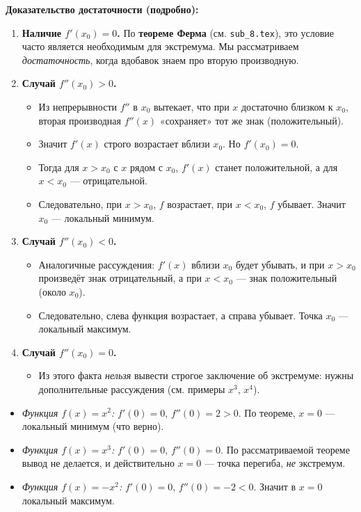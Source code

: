 \textbf{Доказательство достаточности (подробно):}

\begin{enumerate}
  \item \textbf{Наличие $f'(x_0)=0$.}  
    По \textbf{теореме Ферма} (см. \texttt{sub\_8.tex}), это условие часто является необходимым для экстремума. Мы рассматриваем \emph{достаточность}, когда вдобавок знаем про вторую производную.
  \item \textbf{Случай $f''(x_0)>0$.}  
    \begin{itemize}
      \item Из непрерывности $f''$ в $x_0$ вытекает, что при $x$ достаточно близком к $x_0$, вторая производная $f''(x)$ «сохраняет» тот же знак (положительный).  
      \item Значит $f'(x)$ строго возрастает вблизи $x_0$. Но $f'(x_0)=0$.  
      \item Тогда для $x>x_0$ с $x$ рядом с $x_0$, $f'(x)$ станет положительной, а для $x<x_0$ — отрицательной.  
      \item Следовательно, при $x>x_0$, $f$ возрастает, при $x<x_0$, $f$ убывает. Значит $x_0$ — локальный минимум.
    \end{itemize}
  \item \textbf{Случай $f''(x_0)<0$.}  
    \begin{itemize}
      \item Аналогичные рассуждения: $f'(x)$ вблизи $x_0$ будет убывать, и при $x>x_0$ произведёт знак отрицательный, а при $x<x_0$ — знак положительный (около $x_0$).  
      \item Следовательно, слева функция возрастает, а справа убывает. Точка $x_0$ — локальный максимум.
    \end{itemize}
  \item \textbf{Случай $f''(x_0)=0$.}  
    \begin{itemize}
      \item Из этого факта \emph{нельзя} вывести строгое заключение об экстремуме: нужны дополнительные рассуждения (см. примеры $x^3$, $x^4$).
    \end{itemize}
\end{enumerate}

\medskip


\begin{itemize}
  \item \emph{Функция $f(x)=x^2$:}  
  $f'(0)=0$, $f''(0)=2>0$. По теореме, $x=0$ — локальный минимум (что верно).
  \item \emph{Функция $f(x)=x^3$:}  
  $f'(0)=0$, $f''(0)=0$. По рассматриваемой теореме вывод не делается, и действительно $x=0$ — точка перегиба, \textit{не} экстремум.
  \item \emph{Функция $f(x)=-x^2$:}  
  $f'(0)=0$, $f''(0)=-2<0$. Значит в $x=0$ локальный максимум.
\end{itemize}

\medskip

